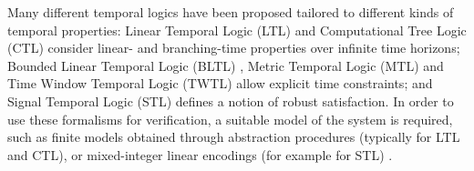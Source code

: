 \documentclass[letterpaper, 10 pt, conference]{ieeeconf/ieeeconf}
\begin{document}


Many different temporal logics have been proposed tailored to different kinds of
temporal properties: Linear Temporal
Logic (LTL) \cite{gerth_simple_1996} and Computational Tree Logic (CTL) \cite{clarke_automatic_1986} 
consider linear- and branching-time
properties over infinite time horizons; Bounded Linear Temporal Logic 
(BLTL) \cite{jha_bayesian_2009}, Metric Temporal Logic (MTL) \cite{luo_using_2016} 
and Time Window Temporal Logic (TWTL) \cite{AkVaBe-ICRA-2016} allow
explicit time constraints; and Signal Temporal Logic (STL) \cite{donze_robust_2010} 
defines a notion of
robust satisfaction. In order to use these formalisms for verification, a
suitable model of the system is required, such as finite models obtained through
abstraction procedures (typically for LTL and CTL), or mixed-integer linear
encodings (for example for STL) \cite{sadraddini_robust_2015}.
\end{document}
